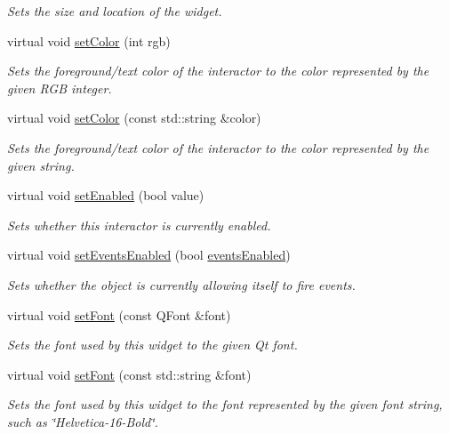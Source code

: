 \begin{DoxyCompactItemize}
\begin{DoxyCompactList}\small\item\em Sets the size and location of the widget. \end{DoxyCompactList}\item 
virtual void \mbox{\hyperlink{classGInteractor_ab1f5cc0f5cc6bbbd716a526c61f1081d}{set\+Color}} (int rgb)
\begin{DoxyCompactList}\small\item\em Sets the foreground/text color of the interactor to the color represented by the given R\+GB integer. \end{DoxyCompactList}\item 
virtual void \mbox{\hyperlink{classGInteractor_a61374df6c11b52cfbb0815decdbaebc6}{set\+Color}} (const std\+::string \&color)
\begin{DoxyCompactList}\small\item\em Sets the foreground/text color of the interactor to the color represented by the given string. \end{DoxyCompactList}\item 
virtual void \mbox{\hyperlink{classGInteractor_ab831367dd84bbd579e02e55bacb21343}{set\+Enabled}} (bool value)
\begin{DoxyCompactList}\small\item\em Sets whether this interactor is currently enabled. \end{DoxyCompactList}\item 
virtual void \mbox{\hyperlink{classGObservable_afaa30b2a9e0f378fd1c70d2f1d0b8216}{set\+Events\+Enabled}} (bool \mbox{\hyperlink{classGInteractor_ac05ba5b92e2e5146d416fe7f842a0969}{events\+Enabled}})
\begin{DoxyCompactList}\small\item\em Sets whether the object is currently allowing itself to fire events. \end{DoxyCompactList}\item 
virtual void \mbox{\hyperlink{classGInteractor_a2592348886ffea646c6534bf88f7c49d}{set\+Font}} (const Q\+Font \&font)
\begin{DoxyCompactList}\small\item\em Sets the font used by this widget to the given Qt font. \end{DoxyCompactList}\item 
virtual void \mbox{\hyperlink{classGInteractor_a8e096e8818d838aceae1d46d58fb3a7b}{set\+Font}} (const std\+::string \&font)
\begin{DoxyCompactList}\small\item\em Sets the font used by this widget to the font represented by the given font string, such as \char`\"{}\+Helvetica-\/16-\/\+Bold\char`\"{}. \end{DoxyCompactList}\item 

\end{DoxyCompactItemize}
